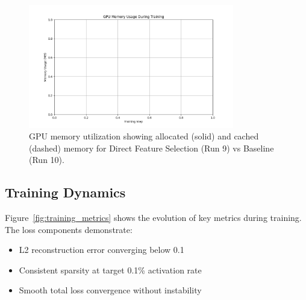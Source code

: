 \documentclass{article} %
\begin{document}
\begin{figure}[h]
    \centering
    \includegraphics[width=0.8\textwidth]{memory_usage.png}
    \caption{GPU memory utilization showing allocated (solid) and cached (dashed) memory for Direct Feature Selection (Run 9) vs Baseline (Run 10).}
    \label{fig:memory_usage}
\end{figure}

\subsection{Training Dynamics}
Figure~\ref{fig:training_metrics} shows the evolution of key metrics during training. The loss components demonstrate:
\begin{itemize}
    \item L2 reconstruction error converging below 0.1
    \item Consistent sparsity at target 0.1\% activation rate
    \item Smooth total loss convergence without instability
\end{itemize}
\end{document}
